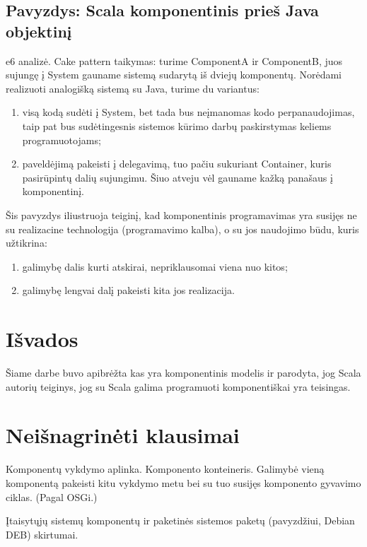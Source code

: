 \section{Pavyzdys: Scala komponentinis prieš Java objektinį}

e6 analizė. Cake pattern taikymas: turime ComponentA ir ComponentB,
juos sujungę į System gauname sistemą sudarytą iš dviejų komponentų.
Norėdami realizuoti analogišką sistemą su Java, turime du variantus:
\begin{enumerate}
  \item visą kodą sudėti į System, bet tada bus neįmanomas kodo
    perpanaudojimas, taip pat bus sudėtingesnis sistemos kūrimo
    darbų paskirstymas keliems programuotojams;
  \item \label{scala:exmp:enum:2} paveldėjimą pakeisti į delegavimą,
    tuo pačiu sukuriant Container, kuris pasirūpintų dalių
    sujungimu. Šiuo atveju vėl gauname kažką panašaus į
    komponentinį.
\end{enumerate}

Šis pavyzdys iliustruoja teiginį, kad komponentinis programavimas yra
susijęs ne su realizacine technologija (programavimo kalba), o su
jos naudojimo būdu, kuris užtikrina:
\begin{enumerate}
  \item galimybę dalis kurti atskirai, nepriklausomai viena nuo kitos;
  \item galimybę lengvai dalį pakeisti kita jos realizacija.
\end{enumerate}

\chapter{Išvados}

Šiame darbe buvo apibrėžta kas yra komponentinis modelis ir parodyta,
jog Scala autorių teiginys, jog su Scala galima programuoti
komponentiškai yra teisingas.

\chapter{Neišnagrinėti klausimai}

Komponentų vykdymo aplinka. Komponento konteineris. Galimybė vieną
komponentą pakeisti kitu vykdymo metu bei su tuo susijęs komponento
gyvavimo ciklas. (Pagal OSGi.)

Įtaisytųjų  sistemų komponentų ir paketinės sistemos
paketų (pavyzdžiui, Debian DEB) skirtumai.

